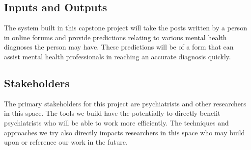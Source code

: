 \documentclass{article}
\begin{document}
%

\subsection{Inputs and Outputs}

The system built in this capstone project will take the posts written by a person in online forums and provide predictions relating to various mental health diagnoses the person may have. These predictions will be of a form that can assist mental health professionals in reaching an accurate diagnosis quickly.

%

\subsection{Stakeholders}

The primary stakeholders for this project are psychiatrists and other researchers in this space. The tools we build have the potentially to directly benefit psychiatrists who will be able to work more efficiently. The techniques and approaches we try also directly impacts researchers in this space who may build upon or reference our work in the future.
\end{document}
